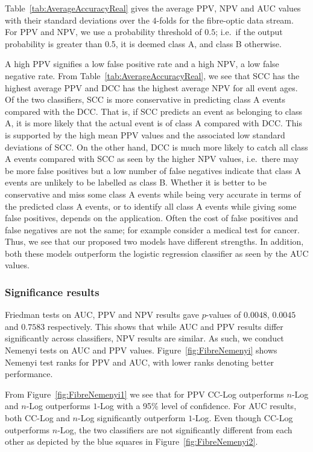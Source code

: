 \documentclass[a4paper,11pt]{article}
\newif\ifxyz
\let\ifxyz\iffalse
\begin{document}
Table~\ref{tab:AverageAccuracyReal} gives the average PPV, NPV and AUC values with their standard deviations over the $4$-folds for the fibre-optic data stream. For PPV and NPV, we use a probability threshold of $0.5$; i.e.\ if the output probability is greater than 0.5, it is deemed class A, and class B otherwise.

\ifxyz A high PPV signifies a low false positive rate and a high NPV, a low false negative rate. From Table~\ref{tab:AverageAccuracyReal}, we see that SCC has the highest average PPV and DCC has the highest average NPV for all event ages.  Of the two classifiers, SCC is more conservative in predicting class A events compared with the DCC\@. That is, if SCC predicts an event as belonging to class A, it is more likely that the actual event is of class A compared with DCC\@. This is supported by the high mean PPV values and the associated low standard deviations of SCC\@. On the other hand, DCC is much more likely to catch all class A events compared with SCC  as seen by the higher NPV values, i.e.\ there may be more false positives but a low number of false negatives indicate that class A events are unlikely to be labelled as class B. Whether it is better to be conservative and miss some class A events while being very accurate in terms of the predicted class A events, or to identify all class A events while giving some false positives, depends on the application. Often the cost of  false positives and false negatives are not the same; for example consider a medical test for cancer. Thus, we see that our proposed two models have different strengths. In addition, both these models outperform the logistic regression classifier as seen by the AUC values. \fi

\subsubsection{Significance results}
Friedman tests on  AUC, PPV and NPV results  gave $p$-values of  $0.0048$, $0.0045$ and $ 0.7583$ respectively. This shows that while AUC and PPV results differ significantly across classifiers, NPV results are similar. As such, we conduct Nemenyi tests on AUC and PPV values. Figure~\ref{fig:FibreNemenyi} shows Nemenyi test ranks for PPV and AUC, with lower ranks denoting better performance.

From Figure~\ref{fig:FibreNemenyi1} we see that for PPV CC-Log outperforms $n$-Log and $n$-Log outperforms $1$-Log with a 95\% level of confidence. For AUC results, both CC-Log and $n$-Log significantly outperform $1$-Log. Even though CC-Log outperforms $n$-Log, the two classifiers are not significantly different from each other as depicted by the blue squares in Figure~\ref{fig:FibreNemenyi2}.
\end{document}
